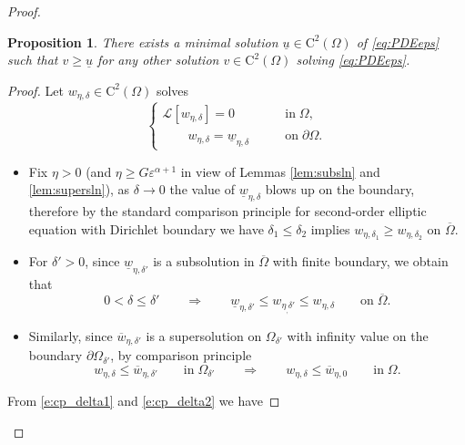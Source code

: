 \documentclass[11pt,reqno]{amsart}
\numberwithin{figure}{section}
\theoremstyle{plain}
\newtheorem{prop}[thm]{Proposition}
\theoremstyle{remark}
\numberwithin{equation}{section}
\begin{document}
\begin{proof}
\begin{prop}\label{pro:minimalsol} There exists a minimal solution $\underline{u}\in \mathrm{C}^2(\Omega)$ of \eqref{eq:PDEeps} such that $v\geq \underline{u}$ for any other solution $v\in \mathrm{C}^2(\Omega)$ solving \eqref{eq:PDEeps}.
\end{prop}
\begin{proof} Let $w_{\eta,\delta}\in \mathrm{C}^2(\Omega)$ solves
    \begin{equation}\label{e:w_def}
    \begin{cases}
        \mathcal{L}\left[w_{\eta,\delta}\right] = 0 &\qquad\text{in}\;\Omega,\\
        \qquad w_{\eta,\delta} = \underline{w}_{\eta,\delta} &\qquad\text{on}\;\partial\Omega.
    \end{cases}
    \end{equation}
    \begin{itemize}
        \item Fix $\eta>0$ (and $\eta\geq G\varepsilon^{\alpha+1}$ in view of Lemmas \ref{lem:subsln} and \ref{lem:supersln}), as $\delta\to 0$ the value of $\underline{w}_{\eta,\delta}$ blows up on the boundary, therefore by the standard comparison principle for second-order elliptic equation with Dirichlet boundary we have $\delta_1 \leq  \delta_2$ implies $w_{\eta,\delta_1}\geq  w_{\eta,\delta_2}$ on $\overline{\Omega}$. 
        \item For $\delta'>0$, since $\underline{w}_{\eta,\delta'}$ is a subsolution in $\overline{\Omega}$ with finite boundary, we obtain that
            \begin{equation}\label{e:cp_delta1}
                0<\delta \leq \delta'\qquad\Longrightarrow\qquad \underline{w}_{\eta,\delta'} \leq w_{\eta_,\delta'}\leq w_{\eta,\delta} \qquad\text{on}\;\overline{\Omega}.
            \end{equation}
        \item Similarly, since $\overline{w}_{\eta,\delta'}$ is a supersolution on $\Omega_{\delta'}$ with infinity value on the boundary $\partial\Omega_{\delta'}$, by comparison principle
            \begin{equation}\label{e:cp_delta2}
                w_{\eta,\delta} \leq \overline{w}_{\eta, \delta'} \qquad\text{in}\;\Omega_{\delta'} \qquad\Longrightarrow\qquad w_{\eta,\delta} \leq \overline{w}_{\eta,0} \qquad\text{in}\;\Omega.
            \end{equation}
    \end{itemize}
    \noindent From \eqref{e:cp_delta1} and \eqref{e:cp_delta2} we have

\end{proof}
\end{proof}
\end{document}
